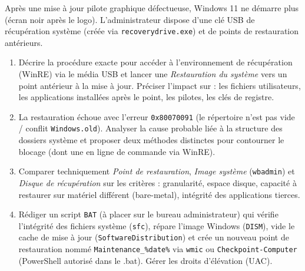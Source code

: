 \documentclass[11pt]{article}
\begin{document}
\begin{exercice}
Après une mise à jour pilote graphique défectueuse, Windows 11 ne démarre plus (écran noir après le logo). L'administrateur dispose d'une clé USB de récupération système (créée via \texttt{recoverydrive.exe}) et de points de restauration antérieurs.
\begin{enumerate}
    \item Décrire la procédure exacte pour accéder à l'environnement de récupération (WinRE) via le média USB et lancer une \textit{Restauration du système} vers un point antérieur à la mise à jour. Préciser l'impact sur : les fichiers utilisateurs, les applications installées après le point, les pilotes, les clés de registre.
    \item La restauration échoue avec l'erreur \texttt{0x80070091} (le répertoire n'est pas vide / conflit \texttt{Windows.old}). Analyser la cause probable liée à la structure des dossiers système et proposer deux méthodes distinctes pour contourner le blocage (dont une en ligne de commande via WinRE).
    \item Comparer techniquement \textit{Point de restauration}, \textit{Image système} (\texttt{wbadmin}) et \textit{Disque de récupération} sur les critères : granularité, espace disque, capacité à restaurer sur matériel différent (bare-metal), intégrité des applications tierces.
    \item Rédiger un script \texttt{BAT} (à placer sur le bureau administrateur) qui vérifie l'intégrité des fichiers système (\texttt{sfc}), répare l'image Windows (\texttt{DISM}), vide le cache de mise à jour (\texttt{SoftwareDistribution}) et crée un nouveau point de restauration nommé \texttt{Maintenance\_\texttt{\%date\%}} via \texttt{wmic} ou \texttt{Checkpoint-Computer} (PowerShell autorisé dans le .bat). Gérer les droits d'élévation (UAC).
\end{enumerate}
\end{exercice}
\end{document}
